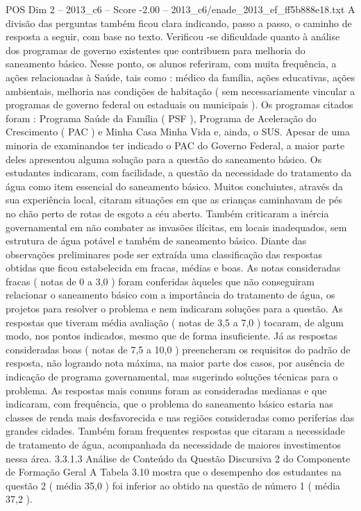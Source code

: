 \begin{textsample}{POS Dim 2 – 2013\_c6 – Score -2.00 – 2013\_c6/enade\_2013\_ef\_ff5b888e18.txt}
A divisão das perguntas também ficou clara indicando, passo a passo, o caminho de resposta a seguir, com base no texto.
Verificou -se dificuldade quanto à análise dos programas de governo existentes que contribuem para melhoria do saneamento básico.
Nesse ponto, os alunos referiram, com muita frequência, a ações relacionadas à Saúde, tais como : médico da família, ações educativas, ações ambientais, melhoria nas condições de habitação ( sem necessariamente vincular a programas de governo federal ou estaduais ou municipais ).
Os programas citados foram : Programa Saúde da Família ( PSF ), Programa de Aceleração do Crescimento ( PAC ) e Minha Casa Minha Vida e, ainda, o SUS.
Apesar de uma minoria de examinandos ter indicado o PAC do Governo Federal, a maior parte deles apresentou alguma solução para a questão do saneamento básico.
Os estudantes indicaram, com facilidade, a questão da necessidade do tratamento da água como item essencial do saneamento básico.
Muitos concluintes, através da sua experiência local, citaram situações em que as crianças caminhavam de pés no chão perto de rotas de esgoto a céu aberto.
Também criticaram a inércia governamental em não combater as invasões ilícitas, em locais inadequados, sem estrutura de água potável e também de saneamento básico.
Diante das observações preliminares pode ser extraída uma classificação das respostas obtidas que ficou estabelecida em fracas, médias e boas.
As notas consideradas fracas ( notas de 0 a 3,0 ) foram conferidas àqueles que não conseguiram relacionar o saneamento básico com a importância do tratamento de água, os projetos para resolver o problema e nem indicaram soluções para a questão.
As respostas que tiveram média avaliação ( notas de 3,5 a 7,0 ) tocaram, de algum modo, nos pontos indicados, mesmo que de forma insuficiente.
Já as respostas consideradas boas ( notas de 7,5 a 10,0 ) preencheram os requisitos do padrão de resposta, não logrando nota máxima, na maior parte dos casos, por ausência de indicação de programa governamental, mas sugerindo soluções técnicas para o problema.
As respostas mais comuns foram as consideradas medianas e que indicaram, com frequência, que o problema do saneamento básico estaria nas classes de renda mais desfavorecida e nas regiões consideradas como periferias das grandes cidades.
Também foram frequentes respostas que citaram a necessidade de tratamento de água, acompanhada da necessidade de maiores investimentos nessa área. 3.3.1.3 Análise de Conteúdo da Questão Discursiva 2 do Componente de Formação Geral A Tabela 3.10 mostra que o desempenho dos estudantes na questão 2 ( média 35,0 ) foi inferior ao obtido na questão de número 1 ( média 37,2 ).

\end{textsample}
